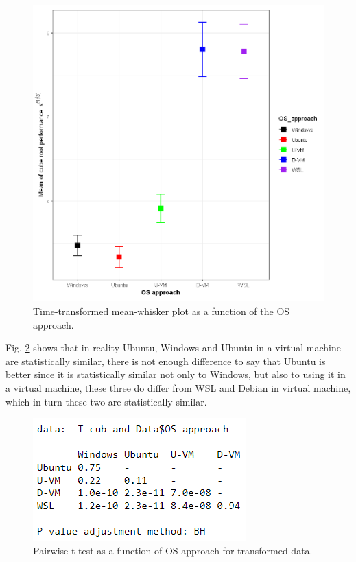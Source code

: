 \documentclass[conference]{IEEEtran}
\begin{document}
\begin{figure}[ht]
    \centering
    \includegraphics[scale=0.5]{figures/mean1.PNG}
    \caption{Time-transformed mean-whisker plot as a function of the OS approach.}
    \label{fig_mean_1}
\end{figure}


Fig. \ref{fig_ttest_1} shows that in reality Ubuntu, Windows and Ubuntu in a virtual machine are statistically similar, there is not enough difference to say that Ubuntu is better since it is statistically similar not only to Windows, but also to using it in a virtual machine, these three do differ from WSL and Debian in virtual machine, which in turn these two are statistically similar.

\begin{figure}[tb]
    \centering
    \includegraphics[scale=0.7]{figures/ttest1.PNG}
    \caption{Pairwise t-test as a function of OS approach for transformed data.}
    \label{fig_ttest_1}
\end{figure}
\end{document}
